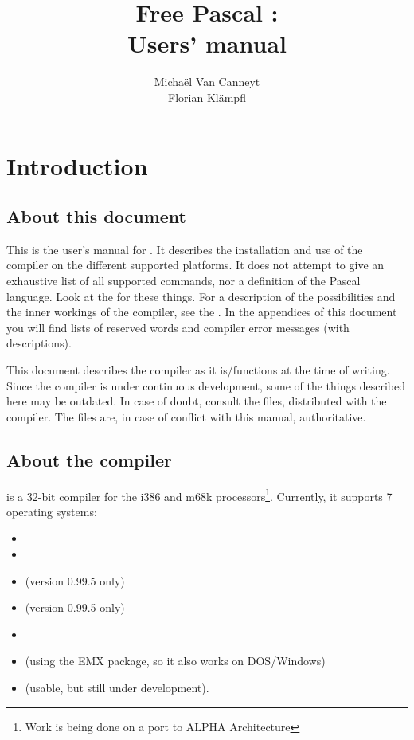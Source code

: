 \documentclass{book}
\begin{document}
\title{Free Pascal :\\ Users' manual}

\author{Micha\"el Van Canneyt\\Florian Kl\"ampfl}
\maketitle
\tableofcontents

\chapter{Introduction}

\section{About this document}
This is the user's manual for \fpc . It describes the installation and
use of the \fpc compiler on the different supported platforms.
It does not attempt to give an exhaustive list of all supported commands,
nor a definition of the Pascal language. Look at the
 for these things.
For a description of the
possibilities and the inner workings of the compiler, see the
\progref . In the appendices of this document you will find lists of
reserved words and compiler error messages (with descriptions).

This document describes the compiler as it is/functions at the time of
writing. Since the compiler is under continuous development, some of the
things described here may be outdated. In case of doubt, consult the
 files, distributed with the compiler.
The  files are, in case of conflict with this manual,
authoritative.

\section{About the compiler}
\fpc is a 32-bit compiler for the i386 and m68k processors\footnote{Work is being done
on a port to ALPHA Architecture}. Currently, it supports 7 operating systems:
\begin{itemize}
\item \dos
\item \linux
\item \atari (version 0.99.5 only)
\item \amiga (version 0.99.5 only)
\item \windows
\item \ostwo (using the EMX package, so it also works on DOS/Windows)
\item \freebsd (usable, but still under development).
\end{itemize}
\end{document}
